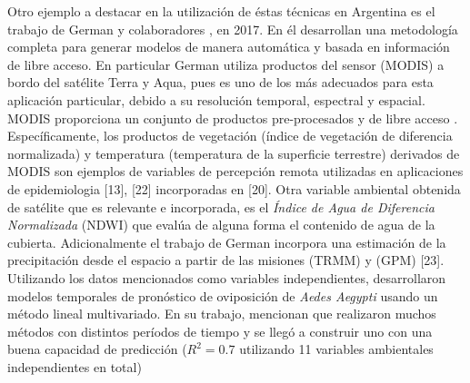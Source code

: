 \par Otro ejemplo a destacar en la utilización de éstas técnicas en Argentina es
  el trabajo de German y colaboradores \cite{german_temporal}, en 2017.
  En él desarrollan una metodología completa
  para generar modelos de manera automática y basada en información de libre
  acceso. En particular German \cite{german_temporal} utiliza productos del sensor (MODIS) a bordo
  del satélite Terra y Aqua, pues es uno de los más adecuados para esta
  aplicación particular, debido a su resolución temporal, espectral y espacial.
  MODIS proporciona un conjunto de productos pre-procesados y de libre acceso \cite{terra_aqua_modis}.
  Específicamente, los productos de vegetación (índice de vegetación de diferencia
  normalizada) y temperatura (temperatura de la superficie terrestre) derivados
  de MODIS son ejemplos de variables de percepción remota utilizadas
  en aplicaciones de epidemiologia [13], [22] incorporadas en [20]. Otra variable
  ambiental obtenida de satélite que es relevante e incorporada, es el
  \textit{Índice de Agua de Diferencia Normalizada} (NDWI) que evalúa de alguna
  forma el contenido de agua de la cubierta. Adicionalmente el trabajo de German
  incorpora una estimación de la precipitación desde el espacio a partir de las
  misiones (TRMM) y (GPM) [23].
  Utilizando los datos mencionados como variables independientes,
  desarrollaron modelos temporales de pronóstico de oviposición de \textit{Aedes Aegypti}
  usando un método lineal multivariado. En su trabajo, mencionan que
  realizaron muchos métodos con distintos períodos de tiempo y se llegó a
  construir uno con una buena capacidad de
  predicción ($R^{2} = 0.7 $ utilizando 11 variables ambientales independientes en total)


